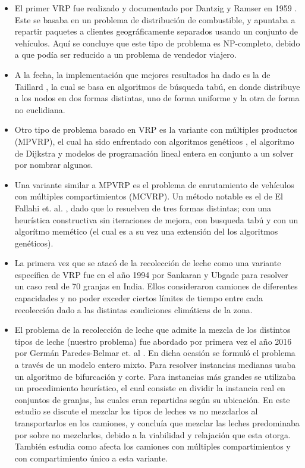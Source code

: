 \begin{itemize}
    \item El primer VRP fue realizado y documentado por Dantzig y Ramser en 1959 \cite{TruckDispatchingProblem}. Este se basaba en un problema de distribución de combustible, y apuntaba a repartir paquetes a clientes geográficamente separados usando un conjunto de vehículos. Aquí se concluye que este tipo de problema es NP-completo, debido a que podía ser reducido a un problema de vendedor viajero.
    
    \item A la fecha, la implementación que mejores resultados ha dado es la de Taillard \cite{Paralleliterativesearchroutingproblems}, la cual se basa en algoritmos de búsqueda tabú, en donde distribuye a los nodos en dos formas distintas, uno de forma uniforme y la otra de forma no euclidiana.
    
    \item Otro tipo de problema basado en VRP es la variante con múltiples productos (MPVRP), el cual ha sido enfrentado con algoritmos genéticos \cite{Modellingtransportlogisticssegregation}, el algoritmo de Dijkstra \cite{multiproductpackingdelivery} y modelos de programación lineal entera en conjunto a un solver \cite{optimizationvehiclethreedimensional} por nombrar algunos.
    
    \item Una variante similar a MPVRP es el problema de enrutamiento de vehículos con múltiples compartimientos (MCVRP). Un método notable es el de El Fallahi et. al. \cite{memeticalgorithmtabusearch}, dado que lo resuelven de tres formas distintas; con una heurística constructiva sin iteraciones de mejora, con busqueda tabú y con un algorítmo memético (el cual es a su vez una extensión del los algoritmos genéticos).
    
    \item La primera vez que se atacó de la recolección de leche como una variante específica de VRP fue en el año 1994 por Sankaran y Ubgade \cite{firstmilk} para resolver un caso real de 70 granjas en India. Ellos consideraron camiones de diferentes capacidades y no poder exceder ciertos límites de tiempo entre cada recolección dado a las distintas condiciones climáticas de la zona.
    
    \item El problema de la recolección de leche que admite la mezcla de los distintos tipos de leche (nuestro problema) fue abordado por primera vez el año 2016 por Germán Paredes-Belmar et. al \cite{MilkWithBlending}. En dicha ocasión se formuló el problema a través de un modelo entero mixto. Para resolver instancias medianas usaba un algoritmo de bifurcación y corte. Para instancias más grandes se utilizaba un procedimiento heurístico, el cual consiste en dividir la instancia real en conjuntos de granjas, las cuales eran repartidas según su ubicación. En este estudio se discute el mezclar los tipos de leches vs no mezclarlos al transportarlos en los camiones, y concluía que mezclar las leches predominaba por sobre no mezclarlos, debido a la viabilidad y relajación que esta otorga. También estudia como afecta los camiones con múltiples compartimientos y con compartimiento único a esta variante.
    

\end{itemize}

